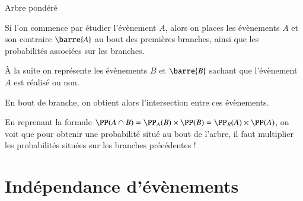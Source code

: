 \documentclass[oneside,12pt]{article}          %
\begin{document}
\begin{definition}{Arbre pondéré}
	\begin{minipage}{0.5\linewidth} \restoreskip \vspace{0pt}
		Si l'on commence par étudier l'évènement $A$, alors on places les évènements $A$ et son contraire $\barre{A}$ au bout des premières branches, ainsi que les probabilités associées sur les branches.
		
		À la suite on représente les évènements $B$ et $\barre{B}$ sachant que l'évènement $A$ est réalisé ou non.
		
		En bout de branche, on obtient alors l'intersection entre ces évènements.
	\end{minipage} \hspace{5mm}
	\begin{minipage}{0.5\linewidth}
	\end{minipage}
\end{definition}

\begin{astuce}
	En reprenant la formule $\PP(A \cap B) = \PP_A(B) \times \PP(B) = \PP_B(A) \times \PP(A)$, on voit que pour obtenir une probabilité situé au bout de l'arbre, il faut multiplier les probabilités situées sur les branches précédentes !
\end{astuce}



\section{Indépendance d'évènements}
\end{document}
